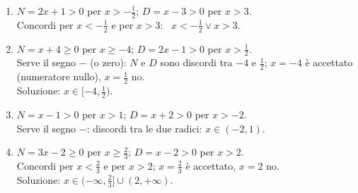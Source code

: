 \begin{question}[ID=2.1, subtitle={Disequazioni frazionarie}, difficulty=facile, tags={disequazioni frazionarie}]
\begin{explanation}
\begin{enumerate}
    Il quoziente è positivo per $x<-1$ e per $x>2$, si annulla in $x=2$ (accettato, c'è $\geq$), non esiste in $x=-1$. \\
    Soluzione: $x\in(-\infty,-1)\cup[2,+\infty)$.
    \item $N=2x+1>0$ per $x>-\tfrac12$; \quad $D=x-3>0$ per $x>3$. \\
    Concordi per $x<-\tfrac12$ e per $x>3$: \ $x<-\tfrac12 \vee x>3$.
    \item $N=x+4\geq 0$ per $x\geq -4$; \quad $D=2x-1>0$ per $x>\tfrac12$. \\
    Serve il segno $-$ (o zero): $N$ e $D$ sono discordi tra $-4$ e $\tfrac12$; $x=-4$ è accettato (numeratore nullo), $x=\tfrac12$ no. \\
    Soluzione: $x\in[-4,\tfrac12)$.
    \item $N=x-1>0$ per $x>1$; \quad $D=x+2>0$ per $x>-2$. \\
    Serve il segno $-$: discordi tra le due radici: $x\in(-2,1)$.
    \item $N=3x-2\geq 0$ per $x\geq\tfrac23$; \quad $D=x-2>0$ per $x>2$. \\
    Concordi per $x<\tfrac23$ e per $x>2$; $x=\tfrac23$ è accettato, $x=2$ no. \\
    Soluzione: $x\in(-\infty,\tfrac23]\cup(2,+\infty)$.
\end{enumerate}
\end{explanation}
\end{question}


